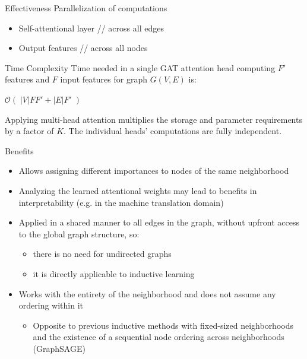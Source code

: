 \documentclass{beamer}
\theoremstyle{definition}
\begin{document}
\begin{frame}{Effectiveness}
    Parallelization of computations
    \begin{itemize}
        \item Self-attentional layer // across all edges
        \item Output features // across all nodes
    \end{itemize} \pause
    \begin{block}{Time Complexity}
        Time needed in a single GAT attention head computing \(F'\) features and \(F\) input features for graph \(G(V,E)\) is:
        \begin{center}
            \(\mathcal{O}(\;|V|FF'+|E|F'\;)\)
        \end{center}
    \end{block} \pause
    Applying multi-head attention multiplies the storage and parameter requirements by a factor of \(K\). The individual heads’ computations are fully independent.
\end{frame}

\begin{frame}{Benefits}
    \begin{itemize}
        \item Allows assigning different importances to nodes of the same neighborhood
        \item Analyzing the learned attentional weights may lead to benefits in interpretability (e.g. in the machine translation domain)
        \item Applied in a shared manner to all edges in the graph, without upfront access to the global graph structure, so:
        \begin{itemize}
            \item there is no need for undirected graphs
            \item it is directly applicable to inductive learning
        \end{itemize}
        \item Works with the entirety of the neighborhood and does not assume any ordering within it
        \begin{itemize}
            \item Opposite to previous inductive methods with fixed-sized neighborhoods and the existence of a sequential node ordering across neighborhoods (GraphSAGE)
        \end{itemize}
    \end{itemize}
\end{frame}
\end{document}
